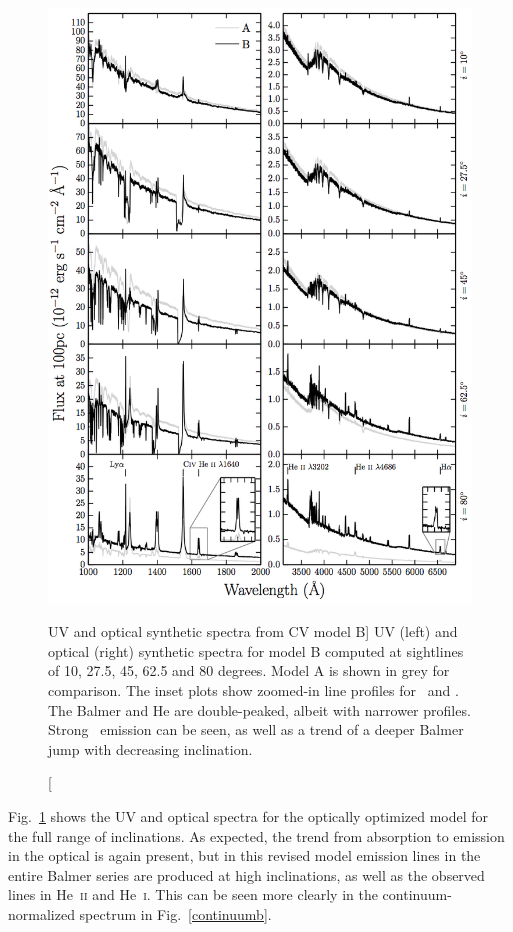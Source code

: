 \begin{figure}
\includegraphics[width=1.0\textwidth]{figures/05-cvpaper/modelb_uv_opt.png}
\caption
[UV and optical synthetic spectra from CV model B]{
UV (left) and optical (right) synthetic spectra for model B computed at
sightlines of 10, 27.5, 45, 62.5 and 80 degrees. 
Model A is shown in grey for comparison.	
The inset plots show zoomed-in line profiles for 
\heiiuv\ and \ha. The Balmer and He
are double-peaked, albeit with narrower profiles.
Strong \heiiopt\ emission can be seen, as well as a trend
of a deeper Balmer jump with decreasing inclination.
}
\label{uvoptb}
\end{figure}

Fig.~\ref{uvoptb} shows the UV and optical spectra for the
optically optimized model for the full range of inclinations. 
As expected, the trend from absorption to emission 
in the optical is again present, but in this revised model emission
lines in the entire Balmer series are produced at high inclinations, as well
as the observed lines 
in He~\textsc{ii} and He~\textsc{i}. This can be seen more clearly in the 
continuum-normalized spectrum in Fig.~\ref{continuumb}.

